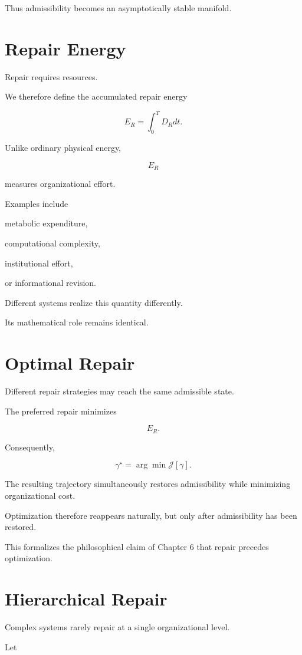 \documentclass[11pt,oneside]{book}
\numberwithin{equation}{chapter}
\theoremstyle{definition}
\theoremstyle{plain}
\begin{document}
Thus admissibility becomes an asymptotically stable manifold.

\section{Repair Energy}

Repair requires resources.

We therefore define the accumulated repair energy

\[
E_R
=
\int_0^T
D_R
dt.
\]

Unlike ordinary physical energy,

\[
E_R
\]

measures organizational effort.

Examples include

metabolic expenditure,

computational complexity,

institutional effort,

or informational revision.

Different systems realize this quantity differently.

Its mathematical role remains identical.

\section{Optimal Repair}

Different repair strategies may reach the same admissible state.

The preferred repair minimizes

\[
E_R.
\]

Consequently,

\[
\gamma^\star
=
\arg\min
\mathcal J[\gamma].
\]

The resulting trajectory simultaneously restores admissibility while
minimizing organizational cost.

Optimization therefore reappears naturally, but only after admissibility has
been restored.

This formalizes the philosophical claim of Chapter 6 that repair precedes
optimization.

\section{Hierarchical Repair}

Complex systems rarely repair at a single organizational level.

Let
\end{document}
